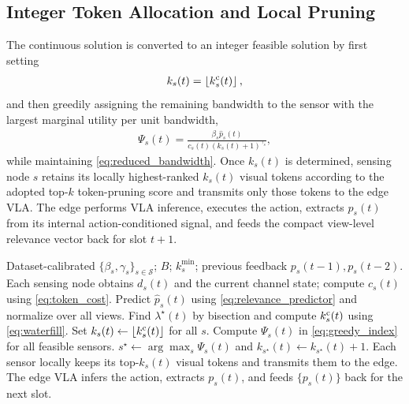 \documentclass[lettersize,journal]{IEEEtran}
\theoremstyle{custom}
\begin{document}
\subsection{Integer Token Allocation and Local Pruning}
The continuous solution is converted to an integer feasible solution by first setting
\begin{align}
    k_s(t)=\left\lfloor k_s^{\rm c}(t)\right\rfloor,
\end{align}
and then greedily assigning the remaining bandwidth to the sensor with the largest marginal utility per unit bandwidth,
\begin{align}\label{eq:greedy_index}
    \Psi_s(t)=
    \frac{\beta_s\widehat p_s(t)}{c_s(t)(k_s(t)+1)^{\gamma_s}},
\end{align}
while maintaining \eqref{eq:reduced_bandwidth}. Once $k_s(t)$ is determined, sensing node $s$ retains its locally highest-ranked $k_s(t)$ visual tokens according to the adopted top-$k$ token-pruning score and transmits only those tokens to the edge VLA. The edge performs VLA inference, executes the action, extracts $p_s(t)$ from its internal action-conditioned signal, and feeds the compact view-level relevance vector back for slot $t+1$.

\begin{algorithm}[t]
\caption{Delayed Action-Relevance-Aware Token Allocation}\label{alg:allocation}
\begin{algorithmic}[1]
\REQUIRE Dataset-calibrated $\{\beta_s,\gamma_s\}_{s\in\mathcal S}$; $B$; $k_s^{\min}$; previous feedback $p_s(t-1),p_s(t-2)$.
\STATE Each sensing node obtains $d_s(t)$ and the current channel state; compute $c_s(t)$ using \eqref{eq:token_cost}.
\STATE Predict $\widehat p_s(t)$ using \eqref{eq:relevance_predictor} and normalize over all views.
\STATE Find $\lambda^\star(t)$ by bisection and compute $k_s^{\rm c}(t)$ using \eqref{eq:waterfill}.
\STATE Set $k_s(t)\leftarrow\lfloor k_s^{\rm c}(t)\rfloor$ for all $s$.
    \STATE Compute $\Psi_s(t)$ in \eqref{eq:greedy_index} for all feasible sensors.
    \STATE $s^\star\leftarrow\arg\max_s\Psi_s(t)$ and $k_{s^\star}(t)\leftarrow k_{s^\star}(t)+1$.
\ENDWHILE
\STATE Each sensor locally keeps its top-$k_s(t)$ visual tokens and transmits them to the edge.
\STATE The edge VLA infers the action, extracts $p_s(t)$, and feeds $\{p_s(t)\}$ back for the next slot.
\end{algorithmic}
\end{algorithm}
\end{document}
